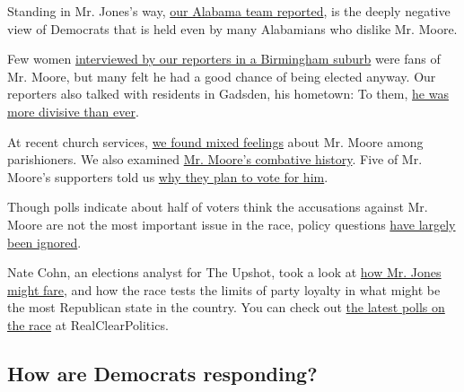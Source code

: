 Standing in Mr. Jones's way,
\href{https://www.nytimes3xbfgragh.onion/2017/12/03/us/doug-jones-alabama-democrats-.html}{our
Alabama team reported}, is the deeply negative view of Democrats that is
held even by many Alabamians who dislike Mr. Moore.

Few women
\href{https://www.nytimes3xbfgragh.onion/2017/11/10/us/alabama-women-roy-moore.html}{interviewed
by our reporters in a Birmingham suburb} were fans of Mr. Moore, but
many felt he had a good chance of being elected anyway. Our reporters
also talked with residents in Gadsden, his hometown: To them,
\href{https://www.nytimes3xbfgragh.onion/2017/11/14/us/roy-moore-gadsden-women.html}{he
was more divisive than ever}.

At recent church services,
\href{https://www.nytimes3xbfgragh.onion/2017/11/19/us/roy-moore-churches-senate.html}{we
found mixed feelings} about Mr. Moore among parishioners. We also
examined
\href{https://www.nytimes3xbfgragh.onion/2017/11/18/us/roy-moore-alabama.html}{Mr.
Moore's combative history}. Five of Mr. Moore's supporters told us
\href{https://www.nytimes3xbfgragh.onion/2017/12/08/us/roy-moore-alabama-supporters.html}{why
they plan to vote for him}.

Though polls indicate about half of voters think the accusations against
Mr. Moore are not the most important issue in the race, policy questions
\href{https://www.nytimes3xbfgragh.onion/2017/12/09/us/alabama-poverty-jobs-roy-moore.html}{have
largely been ignored}.

Nate Cohn, an elections analyst for The Upshot, took a look at
\href{https://www.nytimes3xbfgragh.onion/2017/11/15/upshot/could-a-democrat-actually-win-a-senate-seat-in-alabama-precedents-are-few-but-telling.html}{how
Mr. Jones might fare}, and how the race tests the limits of party
loyalty in what might be the most Republican state in the country. You
can check out
\href{https://www.realclearpolitics.com/epolls/2017/senate/al/alabama_senate_special_election_moore_vs_jones-6271.html\#polls}{the
latest polls on the race} at RealClearPolitics.

\hypertarget{how-are-democrats-responding}{%
\subsection{How are Democrats
responding?}\label{how-are-democrats-responding}}

